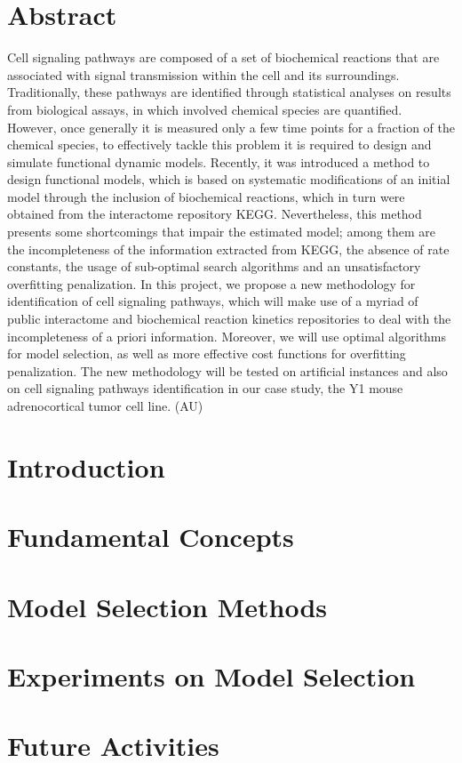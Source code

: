 \documentclass[12pt, twoside]{report}
\numberwithin{mydefinition}{section}
\numberwithin{mytheorem}{section}
\numberwithin{mylemma}{section}
\numberwithin{corollary}{section}
\begin{document}
\chapter*{Abstract}
Cell signaling pathways are composed of a set of biochemical reactions 
that are associated with signal transmission within the cell and its 
surroundings. Traditionally, these pathways are identified through 
statistical analyses on results from biological assays, in which 
involved chemical species are quantified. However, once generally it is 
measured only a few time points for a fraction of the chemical species, 
to effectively tackle this problem it is required to design and simulate 
functional dynamic models. Recently, it was introduced a method to 
design functional models, which is based on systematic modifications of 
an initial model through the inclusion of biochemical reactions, which 
in turn were obtained from the interactome repository KEGG. 
Nevertheless, this method presents some shortcomings that impair the 
estimated model; among them are the incompleteness of the information 
extracted from KEGG, the absence of rate constants, the usage of 
sub-optimal search algorithms and an unsatisfactory overfitting 
penalization. In this project, we propose a new methodology for 
identification of cell signaling pathways, which will make use of a 
myriad of public interactome and biochemical reaction kinetics 
repositories to deal with the incompleteness of a priori information. 
Moreover, we will use optimal algorithms for model selection, as well as 
more effective cost functions for overfitting penalization. The new 
methodology will be tested on artificial instances and also on cell 
signaling pathways identification in our case study, the Y1 mouse 
adrenocortical tumor cell line. (AU)
 
\tableofcontents

\clearpage
{} 

\nocite{*}
\chapter{Introduction}
\label{chap:intro}


\chapter{Fundamental Concepts}
\label{chap:fundamental_concepts}


\chapter{Model Selection Methods}
\label{chap:model_selection}


\chapter{Experiments on Model Selection}
\label{chap:exp_on_model_selection}


\chapter{Future Activities}
\label{chap:future_activities}


\newpage
\printbibliography
\end{document}
